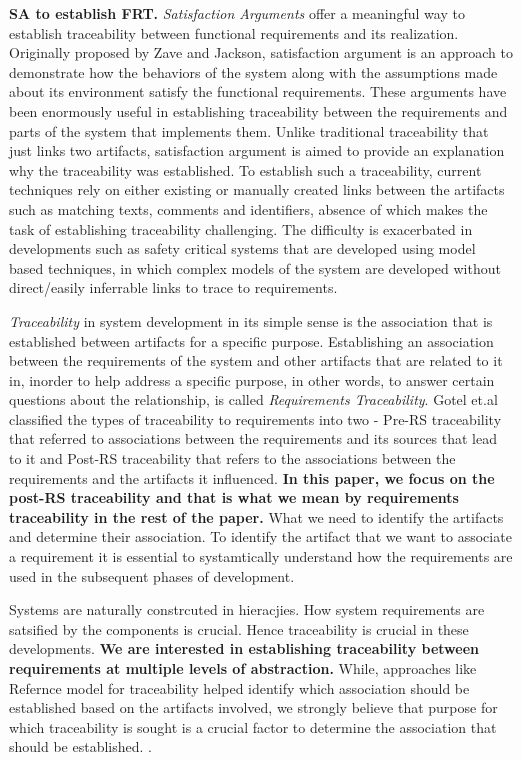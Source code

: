 \textbf{SA to establish FRT.}
\emph{Satisfaction Arguments} offer a meaningful way to establish traceability between functional requirements and its realization. Originally proposed by Zave and Jackson, satisfaction argument is an approach to demonstrate how the behaviors of the system along with the assumptions made about its environment satisfy the functional requirements. These arguments have been enormously useful in establishing traceability between the requirements and parts of the system that implements them. Unlike traditional traceability that just links two artifacts, satisfaction argument is aimed to provide an explanation why the traceability was established. To establish such a traceability, current techniques rely on either existing or manually created links between the artifacts such as matching texts, comments and identifiers, absence of which makes the task of establishing traceability challenging. The difficulty is exacerbated in developments such as safety critical systems that are developed using model based techniques, in which complex models of the system are developed without direct/easily inferrable links to trace to requirements. %



\emph{Traceability} in system development in its simple sense is the association that is established between artifacts for a specific purpose. Establishing an association between the requirements of the system and other artifacts that are related to it in, inorder to help address a specific purpose, in other words, to answer certain questions about the relationship, is called \emph{Requirements Traceability}. Gotel et.al classified the types of traceability to requirements into two - Pre-RS traceability that referred to associations between the requirements and its sources that lead to it and Post-RS traceability that refers to the associations between the requirements and the artifacts it influenced.\textbf{ In this paper, we focus on the post-RS traceability and that is what we mean by requirements traceability in the rest of the paper.}  What we need to identify the artifacts and determine their association. To identify the artifact that we want to associate a requirement it is essential to systamtically understand how the requirements are used in the subsequent phases of development.

Systems are naturally constrcuted in hieracjies. How system requirements are satsified by the components is crucial. Hence traceability is crucial in these developments.\textbf{ We are interested in establishing traceability between requirements at multiple levels of abstraction. }While, approaches like Refernce model for traceability helped identify which association should be established based on the artifacts involved, we strongly believe that purpose for which traceability is sought is a crucial factor to determine the association that should be established. .

